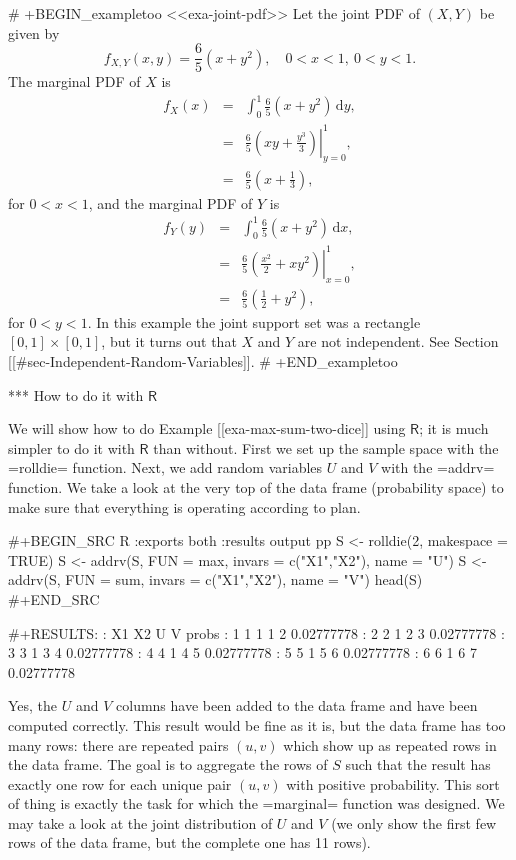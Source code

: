 # +BEGIN_exampletoo
<<exa-joint-pdf>> Let the joint PDF of \((X,Y)\) be given by \[
f_{X,Y}(x,y)=\frac{6}{5}\left(x+y^{2}\right),\quad 0 < x < 1,\ 0 < y
< 1.  \] The marginal PDF of \(X\) is
\begin{eqnarray*}
f_{X}(x) & = & \int_{0}^{1}\frac{6}{5}\left(x+y^{2}\right)\,\mathrm{d} y,\\
 & = & \left.\frac{6}{5}\left(xy+\frac{y^{3}}{3}\right)\right|_{y=0}^{1},\\
 & = & \frac{6}{5}\left(x+\frac{1}{3}\right),
\end{eqnarray*}
for \(0 < x < 1\), and the marginal PDF of \(Y\) is
\begin{eqnarray*}
f_{Y}(y) & = & \int_{0}^{1}\frac{6}{5}\left(x+y^{2}\right)\,\mathrm{d} x,\\
 & = & \left.\frac{6}{5}\left(\frac{x^{2}}{2}+xy^{2}\right)\right|_{x=0}^{1},\\
 & = & \frac{6}{5}\left(\frac{1}{2}+y^{2}\right),
\end{eqnarray*}
for \(0 < y < 1\). In this example the joint support set was a
rectangle \([0,1]\times[0,1]\), but it turns out that \(X\) and \(Y\)
are not independent. See Section [[#sec-Independent-Random-Variables]].
# +END_exampletoo

*** How to do it with \(\mathsf{R}\)

We will show how to do Example [[exa-max-sum-two-dice]] using \(\mathsf{R}\);
it is much simpler to do it with \(\mathsf{R}\) than without. First we
set up the sample space with the =rolldie= function. Next, we add
random variables \(U\) and \(V\) with the =addrv= function. We take a
look at the very top of the data frame (probability space) to make
sure that everything is operating according to plan.

#+BEGIN_SRC R :exports both :results output pp  
S <- rolldie(2, makespace = TRUE)
S <- addrv(S, FUN = max, invars = c("X1","X2"), name = "U")
S <- addrv(S, FUN = sum, invars = c("X1","X2"), name = "V")
head(S)
#+END_SRC

#+RESULTS:
:   X1 X2 U V      probs
: 1  1  1 1 2 0.02777778
: 2  2  1 2 3 0.02777778
: 3  3  1 3 4 0.02777778
: 4  4  1 4 5 0.02777778
: 5  5  1 5 6 0.02777778
: 6  6  1 6 7 0.02777778

Yes, the \(U\) and \(V\) columns have been added to the data frame and
have been computed correctly. This result would be fine as it is, but
the data frame has too many rows: there are repeated pairs \((u,v)\)
which show up as repeated rows in the data frame. The goal is to
aggregate the rows of \(S\) such that the result has exactly one row
for each unique pair \((u,v)\) with positive probability. This sort of
thing is exactly the task for which the =marginal= function was
designed. We may take a look at the joint distribution of \(U\) and
\(V\) (we only show the first few rows of the data frame, but the
complete one has 11 rows).

